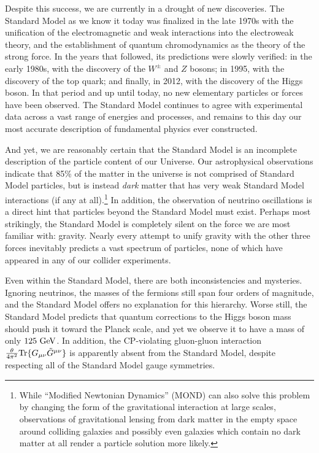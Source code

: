Despite this success, we are currently in a drought of new discoveries. The Standard Model as we know it today was finalized in the late 1970s with the unification of the electromagnetic and weak interactions into the electroweak theory, and the establishment of quantum chromodynamics as the theory of the strong force. In the years that followed, its predictions were slowly verified: in the early 1980s, with the discovery of the $W^\pm$ and $Z$ bosons; in 1995, with the discovery of the top quark; and finally, in 2012, with the discovery of the Higgs boson. In that period and up until today, no new elementary particles or forces have been observed. The Standard Model continues to agree with experimental data across a vast range of energies and processes, and remains to this day our most accurate description of fundamental physics ever constructed.


And yet, we are reasonably certain that the Standard Model is an incomplete description of the particle content of our Universe. Our astrophysical observations indicate that 85\% of the matter in the universe is not comprised of Standard Model particles, but is instead {\it dark} matter that has very weak Standard Model interactions (if any at all).\footnote{While ``Modified Newtonian Dynamics'' (MOND) can also solve this problem by changing the form of the gravitational interaction at large scales, observations of gravitational lensing from dark matter in the empty space around colliding galaxies \cite{Clowe:2006eq} and possibly even galaxies which contain no dark matter at all \cite{van_Dokkum_2018} render a particle solution more likely.} In addition, the observation of neutrino oscillations is a direct hint that particles beyond the Standard Model must exist. Perhaps most strikingly, the Standard Model is completely silent on the force we are most familiar with: gravity. Nearly every attempt to unify gravity with the other three forces inevitably predicts a vast spectrum of particles, none of which have appeared in any of our collider experiments. 

Even within the Standard Model, there are both inconsistencies and mysteries. Ignoring neutrinos, the masses of the fermions still span four orders of magnitude, and the Standard Model offers no explanation for this hierarchy. Worse still, the Standard Model predicts that quantum corrections to the Higgs boson mass should push it toward the Planck scale, and yet we observe it to have a mass of only $125~{\rm GeV}$. In addition, the CP-violating gluon-gluon interaction $\tfrac{\theta}{4\pi^2} {\rm Tr}\{{G}_{\mu\nu}\tilde{G}^{\mu\nu}\}$ is apparently absent from the Standard Model, despite respecting all of the Standard Model gauge symmetries.

